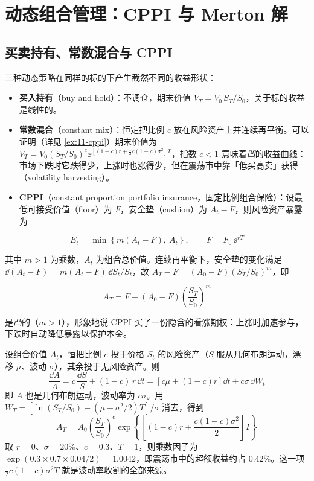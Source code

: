 \section{动态组合管理：CPPI 与 Merton 解}

\subsection{买卖持有、常数混合与 CPPI}

三种动态策略在同样的标的下产生截然不同的收益形状：

\begin{itemize}[leftmargin=1.6em, itemsep=3pt]
  \item \textbf{买入持有}（buy and hold）：不调仓，期末价值 $V_T = V_0\,S_T/S_0$，关于标的收益是线性的。
  \item \textbf{常数混合}（constant mix）：恒定把比例 $c$ 放在风险资产上并连续再平衡。可以证明（详见 \cref{ex:11-cppi}）期末价值为 $V_T = V_0\left(S_T/S_0\right)^{c}\ee^{\left[(1-c)r + \frac{1}{2}c(1-c)\sigma^{2}\right]T}$，指数 $c<1$ 意味着\emph{凹}的收益曲线：市场下跌时它跌得少，上涨时也涨得少，但在震荡市中靠「低买高卖」获得（volatility harvesting）。
  \item \textbf{CPPI}（constant proportion portfolio insurance，固定比例组合保险）：设最低可接受价值（floor）为 $F$，安全垫（cushion）为 $A_t - F$，则风险资产暴露为
\end{itemize}

\begin{equation}\label{eq:11-cppi}
  E_t = \min\left\{m\left(A_t - F\right),\ A_t\right\},
  \qquad F = F_0\,\ee^{rT}
\end{equation}

其中 $m > 1$ 为乘数，$A_t$ 为组合总价值。连续再平衡下，安全垫的变化满足 $\dd(A_t - F) = m(A_t-F)\,\dd S_t/S_t$，故 $A_T - F = (A_0 - F)(S_T/S_0)^{m}$，即

\begin{equation}\label{eq:11-cppi-payoff}
  A_T = F + \left(A_0 - F\right)\left(\frac{S_T}{S_0}\right)^{m}
\end{equation}

 是\emph{凸}的（$m>1$），形象地说 CPPI 买了一份隐含的看涨期权：上涨时加速参与，下跌时自动降低暴露以保护本金。

\begin{example}[常数混合的指数形式推导]\label{ex:11-cppi}
设组合价值 $A_t$，恒把比例 $c$ 投于价格 $S_t$ 的风险资产（$S$ 服从几何布朗运动，漂移 $\mu$、波动 $\sigma$），其余投于无风险资产。则
\[
  \frac{\dd A}{A} = c\,\frac{\dd S}{S} + (1-c)\,r\,\dd t
  = \left[c\mu + (1-c)r\right]\dd t + c\sigma\,\dd W_t
\]
即 $A$ 也是几何布朗运动，波动率为 $c\sigma$。用 $W_T = \left[\ln(S_T/S_0) - (\mu - \sigma^{2}/2)T\right]/\sigma$ 消去，得到
\[
  A_T = A_0\left(\frac{S_T}{S_0}\right)^{c}\exp\left\{\left[(1-c)r + \frac{c(1-c)\sigma^{2}}{2}\right]T\right\}
\]
取 $r = 0$、$\sigma = 20\%$、$c = 0.3$、$T = 1$，则乘数因子为 $\exp(0.3\times 0.7\times 0.04/2) = 1.0042$，即震荡市中的超额收益约占 0.42\%。这一项 $\frac{1}{2}c(1-c)\sigma^{2}T$ 就是波动率收割的全部来源。
\end{example}

